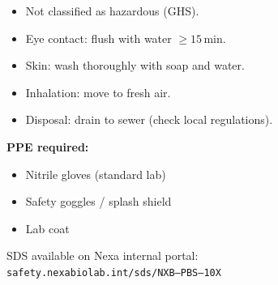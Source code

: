 \documentclass[10pt,a4paper]{article}
\begin{document}
\begin{minipage}[t]{0.32\linewidth}
  \begin{tcolorbox}[
    enhanced, arc=4pt, boxrule=0.6pt,
    colback=NexaWarn!6, colframe=NexaWarn,
    title={\faHardHat\enskip Safety \& Handling},
    fonttitle=\bfseries\color{white}, coltitle=white,
    attach boxed title to top left={yshift=-2mm,xshift=4mm},
    boxed title style={enhanced, arc=3pt, colback=NexaWarn, colframe=NexaWarn, boxrule=0pt},
    top=6mm, bottom=4mm, left=4mm, right=4mm,
  ]
    \small\color{NexaText}
    \begin{itemize}[leftmargin=4mm, itemsep=2pt, topsep=1pt]
      \item[\faTint] Not classified as hazardous (GHS).
      \item[\faEye] Eye contact: flush with water $\geq15\,\text{min}$.
      \item[\faHandPaper] Skin: wash thoroughly with soap and water.
      \item[\faWind] Inhalation: move to fresh air.
      \item[\faTrash] Disposal: drain to sewer (check local regulations).
    \end{itemize}

    \vspace{2mm}
    \textbf{PPE required:}
    \begin{itemize}[leftmargin=4mm, itemsep=1pt, topsep=1pt]
      \item[\faStar] Nitrile gloves (standard lab)
      \item[\faStar] Safety goggles / splash shield
      \item[\faStar] Lab coat
    \end{itemize}

    \vspace{2mm}
    {\scriptsize\color{NexaSubtle}
     SDS available on Nexa internal portal:\\
     \texttt{safety.nexabiolab.int/sds/NXB--PBS--10X}}
  \end{tcolorbox}
\end{minipage}%
\hfill
\end{document}

